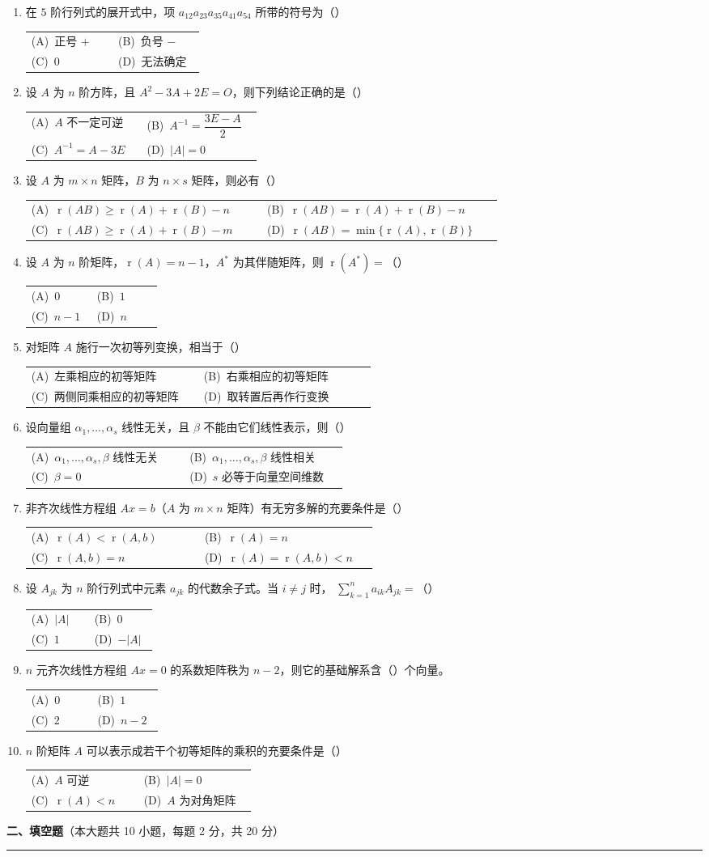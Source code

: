 \documentclass[12pt]{ctexart}
\makeatletter
\newcommand{\rnk}{\operatorname{r}}
\newcommand{\bigsection}[2]{%
  \vspace{7pt}%
  {\noindent\bfseries\large #1}\hfill{\normalsize（本大题共 #2）}\par
  \vspace{2pt}\hrule height0.4pt\vspace{8pt}}
\newcommand{\optgrid}[4]{%
  \par\smallskip\noindent
  \begin{tabular}{@{}p{0.46\linewidth}p{0.46\linewidth}@{}}
  (A)~#1 & (B)~#2 \\[3pt]
  (C)~#3 & (D)~#4
  \end{tabular}}
\makeatother
\begin{document}
\begin{enumerate}[label=\arabic*.]
\item 在 $5$ 阶行列式的展开式中，项 $a_{12}a_{23}a_{35}a_{41}a_{54}$ 所带的符号为（\qquad）
  \optgrid{正号 $+$}{负号 $-$}{$0$}{无法确定}

\item 设 $A$ 为 $n$ 阶方阵，且 $A^{2}-3A+2E=O$，则下列结论正确的是（\qquad）
  \optgrid{$A$ 不一定可逆}{$A^{-1}=\dfrac{3E-A}{2}$}{$A^{-1}=A-3E$}{$|A|=0$}

\item 设 $A$ 为 $m\times n$ 矩阵，$B$ 为 $n\times s$ 矩阵，则必有（\qquad）
  \optgrid{$\rnk(AB)\geq \rnk(A)+\rnk(B)-n$}{$\rnk(AB)=\rnk(A)+\rnk(B)-n$}{$\rnk(AB)\geq \rnk(A)+\rnk(B)-m$}{$\rnk(AB)=\min\{\rnk(A),\rnk(B)\}$}

\item 设 $A$ 为 $n$ 阶矩阵，$\rnk(A)=n-1$，$A^{*}$ 为其伴随矩阵，则 $\rnk(A^{*})=$（\qquad）
  \optgrid{$0$}{$1$}{$n-1$}{$n$}

\item 对矩阵 $A$ 施行一次初等列变换，相当于（\qquad）
  \optgrid{左乘相应的初等矩阵}{右乘相应的初等矩阵}{两侧同乘相应的初等矩阵}{取转置后再作行变换}

\item 设向量组 $\alpha_1,\dots,\alpha_s$ 线性无关，且 $\beta$ 不能由它们线性表示，则（\qquad）
  \optgrid{$\alpha_1,\dots,\alpha_s,\beta$ 线性无关}{$\alpha_1,\dots,\alpha_s,\beta$ 线性相关}{$\beta=0$}{$s$ 必等于向量空间维数}

\item 非齐次线性方程组 $Ax=b$（$A$ 为 $m\times n$ 矩阵）有无穷多解的充要条件是（\qquad）
  \optgrid{$\rnk(A)<\rnk(A,b)$}{$\rnk(A)=n$}{$\rnk(A,b)=n$}{$\rnk(A)=\rnk(A,b)<n$}

\item 设 $A_{jk}$ 为 $n$ 阶行列式中元素 $a_{jk}$ 的代数余子式。当 $i\neq j$ 时，
  $\displaystyle\sum_{k=1}^{n}a_{ik}A_{jk}=$（\qquad）
  \optgrid{$|A|$}{$0$}{$1$}{$-|A|$}

\item $n$ 元齐次线性方程组 $Ax=0$ 的系数矩阵秩为 $n-2$，则它的基础解系含（\qquad）个向量。
  \optgrid{$0$}{$1$}{$2$}{$n-2$}

\item $n$ 阶矩阵 $A$ 可以表示成若干个初等矩阵的乘积的充要条件是（\qquad）
  \optgrid{$A$ 可逆}{$|A|=0$}{$\rnk(A)<n$}{$A$ 为对角矩阵}
\end{enumerate}

\bigsection{二、填空题}{10 小题，每题 2 分，共 20 分}
\end{document}
